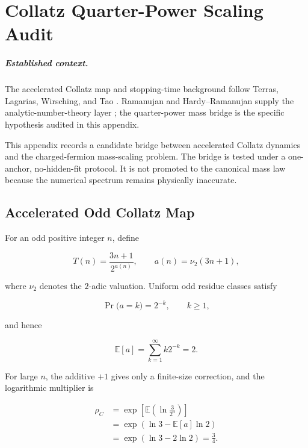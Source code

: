 \chapter{Collatz Quarter-Power Scaling Audit}
\label{app:collatz_quarter_power}


\paragraph{Established context.}
The accelerated Collatz map and stopping-time background follow Terras, Lagarias,
Wirsching, and Tao \cite{Terras1976,Lagarias1985,Wirsching1998,Tao2022Collatz}.
Ramanujan and Hardy--Ramanujan supply the analytic-number-theory layer
\cite{Ramanujan1918,HardyRamanujan1918}; the quarter-power mass bridge is the
specific hypothesis audited in this appendix.

This appendix records a candidate bridge between accelerated Collatz dynamics
and the charged-fermion mass-scaling problem.  The bridge is tested under a
one-anchor, no-hidden-fit protocol.  It is not promoted to the canonical mass
law because the numerical spectrum remains physically inaccurate.

\section{Accelerated Odd Collatz Map}

For an odd positive integer $n$, define

\begin{equation}
T(n)=\frac{3n+1}{2^{a(n)}},
\qquad
 a(n)=\nu_2(3n+1),
\label{eq:accelerated_collatz_quarter}
\end{equation}

where $\nu_2$ denotes the $2$-adic valuation.  Uniform odd residue classes
satisfy

\begin{equation}
\Pr\bigl(a=k\bigr)=2^{-k},
\qquad k\geq 1,
\end{equation}

and hence

\begin{equation}
\mathbb{E}[a]
=\sum_{k=1}^{\infty}k2^{-k}
=2.
\end{equation}

For large $n$, the additive $+1$ gives only a finite-size correction, and the
logarithmic multiplier is

\begin{equation}
\begin{aligned}
\rho_C
&=\exp\left[
\mathbb{E}\left(\ln\frac{3}{2^a}\right)
\right] \\
&=\exp\left(\ln3-\mathbb{E}[a]\ln2\right) \\
&=\exp(\ln3-2\ln2)
=\frac34.
\end{aligned}
\label{eq:collatz_rho_three_quarters}
\end{equation}


